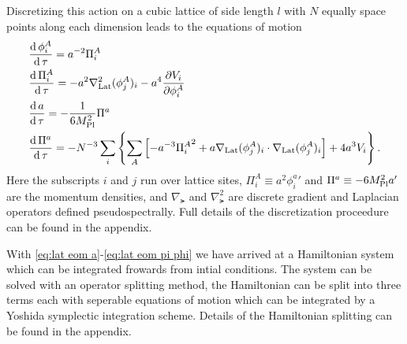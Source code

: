 Discretizing this action on a cubic lattice of side length $l$ with $N$ equally space points along each dimension leads to the equations of motion
\begin{align}
  & \frac{\mathrm{d}\,\phi^A_i}{\mathrm{d}\,\tau} = a^{-2}\Pi^A_i  \label{eq:lat eom a}\\
  & \frac{\mathrm{d}\,\Pi^A_i}{\mathrm{d}\,\tau} = -a^2\nabla^2_{\mathrm{Lat}}(\phi^A_j)_i -a^4\frac{\partial V_i}{\partial \phi^A_i}  \label{eq:lat eom pi a}\\
  & \frac{\mathrm{d}\, a}{\mathrm{d}\,\tau} = -\frac{1}{6M_{\mathrm{Pl}}^2}\Pi^a  \label{eq:lat eom phi}\\
  & \frac{\mathrm{d}\,\Pi^a}{\mathrm{d}\,\tau} = -N^{-3}\sum_i\left\{
  \sum_A\left[-a^{-3}{\Pi^A_i}^2 + a\nabla_{\mathrm{Lat}}(\phi^A_j)_i\cdot\nabla_{\mathrm{Lat}}(\phi^A_j)_i \right]
  + 4a^3V_i\right\}.  \label{eq:lat eom pi phi}  
\end{align}
Here the subscripts $i$ and $j$ run over lattice sites, $\Pi^A_i \equiv a^2{\phi^a_i}'$ and $\Pi^a \equiv -6M_{\mathrm{Pl}}^2a'$ are the momentum densities, and $\nabla_\lat$ and $\nabla^2_\lat$ are discrete gradient and Laplacian operators defined pseudospectrally.
Full details of the discretization proceedure can be found in the appendix.


With \eqref{eq:lat eom a}-\eqref{eq:lat eom pi phi} we have arrived at a Hamiltonian system which can be integrated frowards from intial conditions.
The system can be solved with an operator splitting method, the Hamiltonian can be split into three terms each with seperable equations of motion which can be integrated by a Yoshida symplectic integration scheme.
Details of the Hamiltonian splitting can be found in the appendix.

